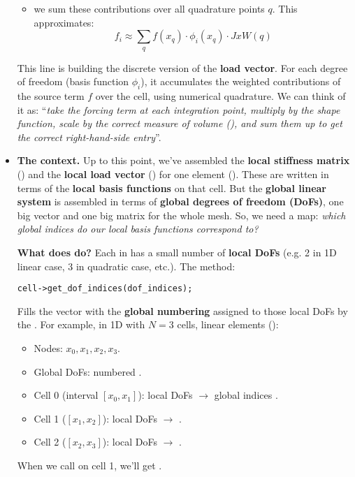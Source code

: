 \begin{itemize}
\begin{itemize}
        \item {} we sum these contributions over all quadrature points $q$. This approximates:
        \begin{equation*}
            f_i \approx \sum_q f(x_q) \cdot \phi_i(x_q) \cdot JxW(q)
        \end{equation*}
    \end{itemize}
    This line is building the discrete version of the \textbf{load vector}. For each degree of freedom (basis function $\phi_{i}$), it accumulates the weighted contributions of the source term $f$ over the cell, using numerical quadrature. We can think of it as: ``\emph{take the forcing term at each integration point, multiply by the shape function, scale by the correct measure of volume (), and sum them up to get the correct right-hand-side entry}''.


    \item {}
    
    \textcolor{Green3}{ \textbf{The context.}} Up to this point, we've assembled the \textbf{local stiffness matrix} () and the \textbf{local load vector} () for one element (). These are written in terms of the \textbf{local basis functions} on that cell. But the \textbf{global linear system} is assembled in terms of \textbf{global degrees of freedom (DoFs)}, one big vector  and one big matrix  for the whole mesh. So, we need a map: \emph{which global indices do our local basis functions correspond to?}

    \textcolor{Green3}{ \textbf{What does  do?}} Each  in  has a small number of \textbf{local DoFs} (e.g. 2 in 1D linear case, 3 in quadratic case, etc.). The method:
    \begin{lstlisting}
cell->get_dof_indices(dof_indices);\end{lstlisting}
    Fills the vector  with the \textbf{global numbering} assigned to those local DoFs by the . For example, in 1D with $N=3$ cells, linear elements ():
    \begin{itemize}
        \item Nodes: $x_0, x_1, x_2, x_3$.
        \item Global DoFs: numbered \code{[0,1,2,3]}.
        \item Cell 0 (interval $[x_0, x_1]$): local DoFs $\to$ global indices \code{[0,1]}.
        \item Cell 1 ($[x_1, x_2]$): local DoFs $\to$ \code{[1,2]}.
        \item Cell 2 ($[x_2, x_3]$): local DoFs $\to$ \code{[2,3]}.
    \end{itemize}
    When we call  on cell 1, we'll get .


\end{itemize}
